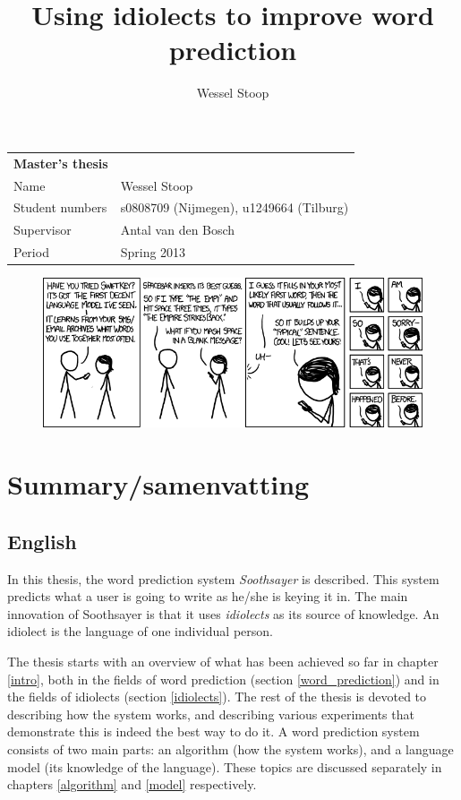 \documentclass[12pt]{article}
\title{Using idiolects to improve word prediction}
\author{Wessel Stoop}
\let\stdsection\section
\renewcommand\section{\newpage\stdsection}
\let\originaltable\table
\let\endoriginaltable\endtable
\renewenvironment{table}[1][ht]{%
  \originaltable[#1]
  \centering}%
  {\endoriginaltable}
\begin{document}
\begin{table}[b]
\begin{tabular}{ll}
\textbf{Master's thesis}&\\
Name&Wessel Stoop\\
Student numbers&s0808709 (Nijmegen), u1249664 (Tilburg)\\
Supervisor&Antal van den Bosch\\
Period&Spring 2013\\
\end{tabular}
\end{table}

\maketitle
\thispagestyle{empty}

\begin{figure}
\includegraphics[scale=0.5]{swiftkey}
\end{figure}

\clearpage

\tableofcontents
\listoftables
\listoffigures

\section{Summary/samenvatting}

\subsection{English}
In this thesis, the word prediction system \emph{Soothsayer} is described. This system predicts what a user is going to write as he/she is keying it in. The main innovation of Soothsayer is that it uses \emph{idiolects} as its source of knowledge. An idiolect is the language of one individual person. 

The thesis starts with an overview of what has been achieved so far in chapter \ref{intro}, both in the fields of word prediction (section \ref{word_prediction}) and in the fields of idiolects (section \ref{idiolects}). The rest of the thesis is devoted to describing how the system works, and describing various experiments that demonstrate this is indeed the best way to do it. A word prediction system consists of two main parts: an algorithm (how the system works), and a language model (its knowledge of the language). These topics are discussed separately in chapters \ref{algorithm} and \ref{model} respectively.
\end{document}
